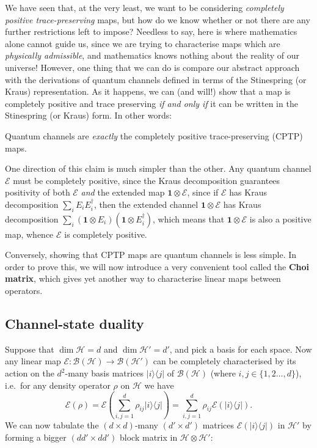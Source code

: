 \documentclass[fleqn,a4paper]{article}
\newenvironment{idea}{\everypar{\setlength{\parindent}{1.5em}}}{}
\theoremstyle{definition}
\theoremstyle{definition}
\theoremstyle{definition}
\theoremstyle{definition}
\theoremstyle{remark}
\begin{document}
We have seen that, at the very least, we want to be considering \emph{completely positive trace-preserving} maps, but how do we know whether or not there are any further restrictions left to impose?
Needless to say, here is where mathematics alone cannot guide us, since we are trying to characterise maps which are \emph{physically admissible}, and mathematics knows nothing about the reality of our universe!
However, one thing that we can do is compare our abstract approach with the derivations of quantum channels defined in terms of the Stinespring (or Kraus) representation.
As it happens, we can (and will!) show that a map is completely positive and trace preserving \emph{if and only if} it can be written in the Stinespring (or Kraus) form.
In other words:

\begin{idea}
Quantum channels are \emph{exactly} the completely positive trace-preserving (CPTP) maps.

\end{idea}

One direction of this claim is much simpler than the other.
Any quantum channel \(\mathcal{E}\) must be completely positive, since the Kraus decomposition guarantees positivity of both \(\mathcal{E}\) \emph{and} the extended map \(\mathbf{1}\otimes\mathcal{E}\), since if \(\mathcal{E}\) has Kraus decomposition \(\sum_i E_i E_i^\dagger\), then the extended channel \(\mathbf{1}\otimes\mathcal{E}\) has Kraus decomposition \(\sum_i(\mathbf{1}\otimes E_i)(\mathbf{1}\otimes E_i^\dagger)\), which means that \(\mathbf{1}\otimes\mathcal{E}\) is also a positive map, whence \(\mathcal{E}\) is completely positive.

Conversely, showing that CPTP maps are quantum channels is less simple.
In order to prove this, we will now introduce a very convenient tool called the \textbf{Choi matrix}, which gives yet another way to characterise linear maps between operators.

\hypertarget{channel-state-duality}{%
\subsection{Channel-state duality}\label{channel-state-duality}}

Suppose that \(\dim\mathcal{H}=d\) and \(\dim\mathcal{H}'=d'\), and pick a basis for each space.
Now any linear map \(\mathcal{E}\colon\mathcal{B}(\mathcal{H})\to\mathcal{B}(\mathcal{H'})\) can be completely characterised by its action on the \(d^2\)-many basis matrices \(|i\rangle\langle j|\) of \(\mathcal{B}(\mathcal{H})\) (where \(i,j\in\{1,2\ldots,d\}\)), i.e.~for any density operator \(\rho\) on \(\mathcal{H}\) we have
\[
  \mathcal{E}(\rho)
  = \mathcal{E}\left(\sum_{i,j=1}^d\rho_{ij} |i\rangle\langle j|\right)
  = \sum_{i,j=1}^d\rho_{ij}\mathcal{E}(|i\rangle\langle j|).
\tag{$\natural$}
\]
We can now tabulate the \((d\times d)\)-many \((d'\times d')\) matrices \(\mathcal{E}(|i\rangle\langle j|)\) in \(\mathcal{H}'\) by forming a bigger \((dd'\times dd')\) block matrix in \(\mathcal{H}\otimes\mathcal{H}'\):
\end{document}
